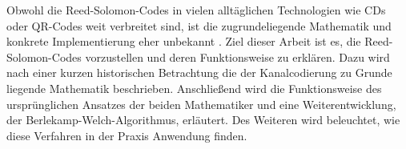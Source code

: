 Obwohl die Reed-Solomon-Codes in vielen alltäglichen Technologien wie CDs oder QR-Codes weit verbreitet sind, ist die zugrundeliegende Mathematik und konkrete Implementierung eher unbekannt \cite{wickerReedSolomonCodes1994}. 
Ziel dieser Arbeit ist es, die Reed-Solomon-Codes vorzustellen und deren Funktionsweise zu erklären. 
Dazu wird nach einer kurzen historischen Betrachtung die der Kanalcodierung zu Grunde liegende Mathematik beschrieben.
Anschließend wird die Funktionsweise des ursprünglichen Ansatzes der beiden Mathematiker und eine Weiterentwicklung, der Berlekamp-Welch-Algorithmus, erläutert.
Des Weiteren wird beleuchtet, wie diese Verfahren in der Praxis Anwendung finden. 
